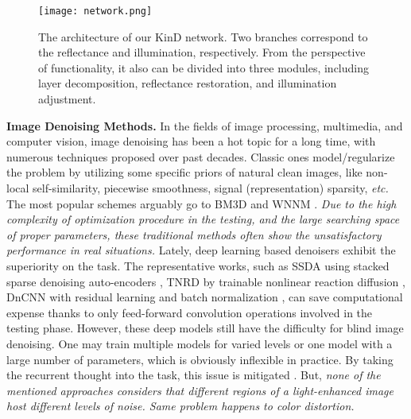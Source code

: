 \documentclass[journal,10pt,compsoc]{IEEEtran}
\begin{document}
\begin{figure*}[t]
	\begin{center}
		\texttt{[image: network.png]}
	\end{center}
	\caption{The architecture of our KinD network. Two branches correspond to the reflectance and illumination, respectively. From the perspective of functionality, it also can be divided into three modules, including layer decomposition, reflectance restoration, and illumination adjustment.}
	\vspace{-0pt}
	\label{fig:net}
\end{figure*}


\textbf{Image Denoising Methods.} In the fields of image processing, multimedia, and computer vision,  image denoising has been a hot topic for a long time, with numerous techniques proposed over past decades. Classic ones model/regularize the problem by utilizing some specific priors of natural clean images, like non-local self-similarity, piecewise smoothness, signal (representation) sparsity, {\it etc.} The most popular schemes arguably go to BM3D \cite{BM3D} and WNNM \cite{WNNM}. {\it Due to the high complexity of optimization procedure in the testing, and the large searching space of proper parameters, these traditional methods often show the unsatisfactory performance in real situations.} Lately, deep learning based denoisers exhibit the superiority on the task. The representative works, such as SSDA using stacked sparse denoising auto-encoders \cite{SSDA1,SSDA2}, TNRD by trainable nonlinear reaction diffusion \cite{TNRD}, DnCNN with residual learning and batch normalization \cite{DnCNN}, can save computational expense thanks to only feed-forward convolution operations involved in the testing phase. However, these deep models still have the difficulty for blind image denoising. One may train multiple models for varied levels or one model with a large number of parameters, which is obviously inflexible in practice. By taking the recurrent thought into the task, this issue is mitigated \cite{Unfolding}. But, {\it none of the mentioned approaches considers that different regions of a light-enhanced image host different levels of noise. Same problem happens to color distortion.}
\end{document}
